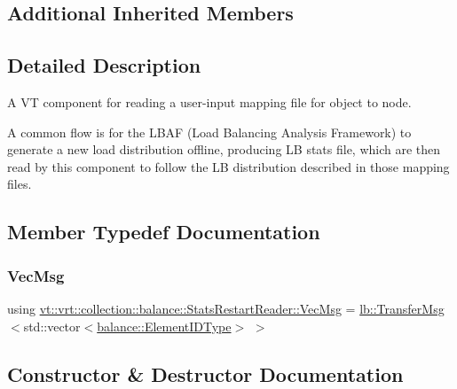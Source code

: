 \subsection*{Additional Inherited Members}


\subsection{Detailed Description}
A VT component for reading a user-\/input mapping file for object to node. 

A common flow is for the L\+B\+AF (Load Balancing Analysis Framework) to generate a new load distribution offline, producing LB stats file, which are then read by this component to follow the LB distribution described in those mapping files. 

\subsection{Member Typedef Documentation}
\mbox{\label{structvt_1_1vrt_1_1collection_1_1balance_1_1_stats_restart_reader_a7e2a74977e595242bf3abb6c83b7e27b}} 
\subsubsection{\texorpdfstring{Vec\+Msg}{VecMsg}}
{\footnotesize\ttfamily using \hyperlink{structvt_1_1vrt_1_1collection_1_1balance_1_1_stats_restart_reader_a7e2a74977e595242bf3abb6c83b7e27b}{vt\+::vrt\+::collection\+::balance\+::\+Stats\+Restart\+Reader\+::\+Vec\+Msg} =  \hyperlink{structvt_1_1vrt_1_1collection_1_1lb_1_1_transfer_msg}{lb\+::\+Transfer\+Msg}$<$std\+::vector$<$\hyperlink{namespacevt_1_1vrt_1_1collection_1_1balance_a14c8d2c972f2913aa3f1636e5be0a120}{balance\+::\+Element\+I\+D\+Type}$>$ $>$}



\subsection{Constructor \& Destructor Documentation}
\mbox{\label{structvt_1_1vrt_1_1collection_1_1balance_1_1_stats_restart_reader_a6813a4a484008c90cc12fb384e20f8c1}} 

